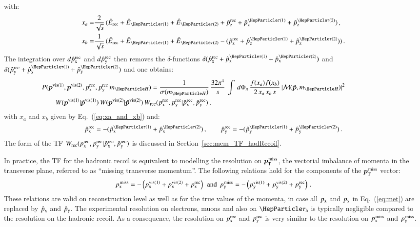 with:
\begin{align}
x_{a} = & \frac{2}{\sqrt{s}} \, (\Ehat_{\rec} + \Ehat_{\Pgt(1)} +
\Ehat_{\Pgt(2)} + \pZhat^{\rec} + \pZhat^{\Pgt(1)} + \pZhat^{\Pgt(2)})
\, , \nonumber \\
x_{b} = & \frac{1}{\sqrt{s}} \, (\Ehat_{\rec} + \Ehat_{\Pgt(1)} + \Ehat_{\Pgt(2)} - (\pZhat^{\rec} + \pZhat^{\Pgt(1)} + \pZhat^{\Pgt(2)})) \, .
\label{eq:xa_and_xb}
\end{align}
The integration over $d\hat{p}_{\textrm{x}}^{\textrm{rec}}$ and $d\hat{p}_{\textrm{y}}^{\textrm{rec}}$ then removes the $\delta$-functions 
$\delta( \pXhat^{\rec} + \pXhat^{\Pgt(1)} + \pXhat^{\Pgt(2)} )$ and
$\delta( \pYhat^{\rec} + \pYhat^{\Pgt(1)} + \pYhat^{\Pgt(2)} )$ and one obtains:
\begin{align}
&
P(\bm{p}^{\vis(1)},\bm{p}^{\vis(2)},\pX^{\rec},\pY^{\rec}|m_{\PHiggs})
= \frac{1}{\sigma(m_{\PHiggs})} \, \frac{32\pi^{4}}{s} \, \int \,
d\Phi_{n} \, \frac{f(x_{a}) f(x_{b})}{2 \, x_{a} \, x_{b} \, s} \, \vert \mathcal{M}(\bm{\tilde{p}},m_{\PHiggs}) \vert^{2} \, \hspace{2cm} \nonumber \\
& \qquad W(\bm{p}^{\vis(1)}|\hat{\bm{p}}^{\vis(1)}) \, W(\bm{p}^{\vis(2)}|\hat{\bm{p}}^{\vis(2)}) \, W_{\rec}( \pX^{\rec},\pY^{\rec} | \pXhat^{\rec},\pYhat^{\rec} ) \, ,
\label{eq:mem_with_hadRecoil}
\end{align}
with $x_{a}$ and $x_{b}$ given by Eq.~(\ref{eq:xa_and_xb}) and:
\begin{equation}
\pXhat^{\rec} = -(\pXhat^{\Pgt(1)} + \pXhat^{\Pgt(2)}) \, ,
\qquad \pYhat^{\rec} = -(\pYhat^{\Pgt(1)} + \pYhat^{\Pgt(2)}) \, .
\label{eq:xpXhat_and_pYhat}
\end{equation}
The form of the TF $W_{\textrm{rec}}( p_{\textrm{x}}^{\textrm{rec}},p_{\textrm{y}}^{\textrm{rec}} | \hat{p}_{\textrm{x}}^{\textrm{rec}},\hat{p}_{\textrm{y}}^{\textrm{rec}} )$ is
discussed in Section~\ref{sec:mem_TF_hadRecoil}.

In practice, the TF for the hadronic recoil is equivalent to modelling
the resolution on $\bm{p}_{\textrm{T}}^{\textrm{\kern0.10em miss}}$, the vectorial imbalance of momenta in the
transverse plane, referred to as ``missing transverse momentum''.
The following relations hold for the components of the $\bm{p}_{\textrm{T}}^{\textrm{\kern0.10em miss}}$
vector:
\begin{equation}
p_{\textrm{x}}^{\textrm{\kern0.10em miss}} = - \left( p_{\textrm{x}}^{\textrm{vis}(1)} + p_{\textrm{x}}^{\textrm{vis}(2)} + p_{\textrm{x}}^{\textrm{rec}} \right)
\, \mbox { and } \,
p_{\textrm{y}}^{\textrm{\kern0.10em miss}} = - \left( p_{\textrm{y}}^{\textrm{vis}(1)} + p_{\textrm{y}}^{\textrm{vis}(2)} + p_{\textrm{y}}^{\textrm{rec}} \right) \, .
\label{eq:met}
\end{equation}
These relations are valid on reconstruction level as well as for the
true values of the momenta, \ie in case all $p_{\textrm{x}}$ and $p_{\textrm{y}}$ in
Eq.~(\ref{eq:met}) are replaced by $\hat{p}_{\textrm{x}}$ and $\hat{p}_{\textrm{y}}$.
The experimental resolution on electrons, muons and also on $\tauh$ is typically negligible compared to the resolution on the hadronic recoil.
As a consequence, the resolution on $p_{\textrm{x}}^{\textrm{rec}}$ and $p_{\textrm{y}}^{\textrm{rec}}$ is
very similar to the resolution on $p_{\textrm{x}}^{\textrm{\kern0.10em miss}}$ and $p_{\textrm{y}}^{\textrm{\kern0.10em miss}}$.

